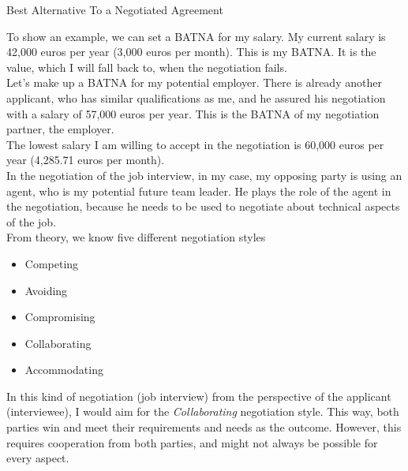 \begin{center}
	\noindent Best Alternative To a Negotiated Agreement
\end{center}


\noindent To show an example, we can set a BATNA for my salary. 
My current salary is 42,000 euros per year (3,000 euros per month).
This is my BATNA. It is the value, which I will fall back to,
when the negotiation fails. \\


\noindent Let's make up a BATNA for my potential employer. 
There is already another applicant, who has similar qualifications as me,
and he assured his negotiation with a salary of 57,000 euros per year.
This is the BATNA of my negotiation partner, the employer. \\

\noindent The lowest salary I am willing to 
accept in the negotiation is 60,000 euros per year (4,285.71 euros per month). \\

\noindent In the negotiation of the job interview, in my case,
my opposing party is using an agent, who is my potential future 
team leader. He plays the role of the agent in the negotiation,
because he needs to be used to negotiate about technical aspects
of the job. \\



\noindent From theory, we know five different negotiation styles

\begin{itemize}
	\item Competing
	\item Avoiding
	\item Compromising
	\item Collaborating
	\item Accommodating
\end{itemize}

\noindent In this kind of negotiation (job interview) from the perspective 
of the applicant (interviewee), I would aim for the \emph{Collaborating} 
negotiation style. This way, both parties win and meet their requirements and
needs as the outcome. However, this requires cooperation from both parties,
and might not always be possible for every aspect. \\

